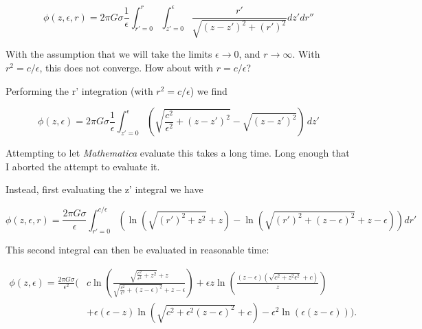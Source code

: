 \begin{equation}\label{eqn:InfinitePlanePotentialTakeIII:30}
\phi (z, \epsilon , r)= 2 \pi  G \sigma  \frac{1}{\epsilon }\int _{r' = 0}^r\int _{z' = 0}^{\epsilon }\frac{r'}{\sqrt{\left(z-z'\right)^2+\left(r'\right)^2}}dz' dr''
\end{equation}

With the assumption that we will take the limits $\epsilon \rightarrow 0$, and $r \rightarrow \infty$.  With $r^2 = c/\epsilon$, this does not converge.  How about with $r = c/\epsilon$?

Performing the r' integration (with $r^2 = c/\epsilon$) we find

\begin{equation}\label{eqn:InfinitePlanePotentialTakeIII:50}
\phi (z, \epsilon )= 2 \pi  G \sigma  \frac{1}{\epsilon }\int_{z' = 0}^{\epsilon } \left(\sqrt{\frac{c^2}{\epsilon ^2}+(z-z')^2}-\sqrt{(z-z')^2}\right) \, dz'
\end{equation}

Attempting to let \textit{Mathematica} evaluate this takes a long time.  Long enough that I aborted the attempt to evaluate it.

Instead, first evaluating the z' integral we have

\begin{equation}\label{eqn:InfinitePlanePotentialTakeIII:70}
\phi (z, \epsilon , r)=\frac{2 \pi  G \sigma }{\epsilon }
\int _{r' = 0}^{c/\epsilon }\left(\ln \left(\sqrt{\left(r'\right)^2+z^2}+z\right)-\ln \left(\sqrt{\left(r'\right)^2+(z-\epsilon )^2}+z-\epsilon \right)\right)
dr'
\end{equation}

This second integral can then be evaluated in reasonable time:

\begin{equation}\label{eqn:InfinitePlanePotentialTakeIII:90}
\begin{aligned}
\phi (z, \epsilon )
= 
\frac{2 \pi  G \sigma }{\epsilon ^2} 
\Biggl( 
&c \ln \left(\frac{\sqrt{\frac{c^2}{\epsilon ^2}+z^2}+z}{\sqrt{\frac{c^2}{\epsilon ^2}+(z-\epsilon )^2}+z-\epsilon }\right) 
+ \epsilon z \ln \left(\frac{(z-\epsilon ) \left(\sqrt{c^2+z^2 \epsilon ^2}+c\right)}{z}\right) \\
&+ \epsilon (\epsilon -z) \ln \left(\sqrt{c^2+\epsilon ^2 (z-\epsilon )^2}+c\right) 
- \epsilon^2  \ln (\epsilon  (z-\epsilon )) 
\Biggr).
\end{aligned}
\end{equation}

